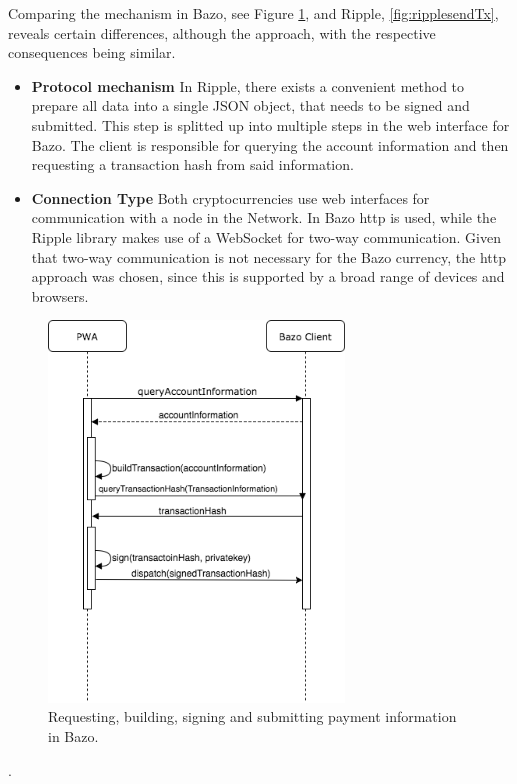 Comparing the mechanism in Bazo, see Figure \ref{fig:TransactionProcess}, and Ripple, \ref{fig:ripplesendTx}, reveals certain differences, although the approach, with the respective consequences being similar.
\begin{itemize}
\item \textbf{Protocol mechanism} In Ripple, there exists a convenient method to prepare all data into a single JSON object, that needs to be signed and submitted. This step is splitted up into multiple steps in the web interface for Bazo. The client is responsible for querying the account information and then requesting a transaction hash from said information.
\item \textbf{Connection Type} Both cryptocurrencies use web interfaces for communication with a node in the Network. In Bazo http is used, while the Ripple library makes use of a WebSocket for two-way communication. Given that two-way communication is not necessary for the Bazo currency, the http approach was chosen, since this is supported by a broad range of devices and browsers.
\end{itemize}

\begin{figure}
\centering
\includegraphics[width=0.7\textwidth]{diagrams/transactionProcess.png}
\caption{\label{fig:TransactionProcess}Requesting, building, signing and submitting payment information in Bazo.}
\end{figure}.

